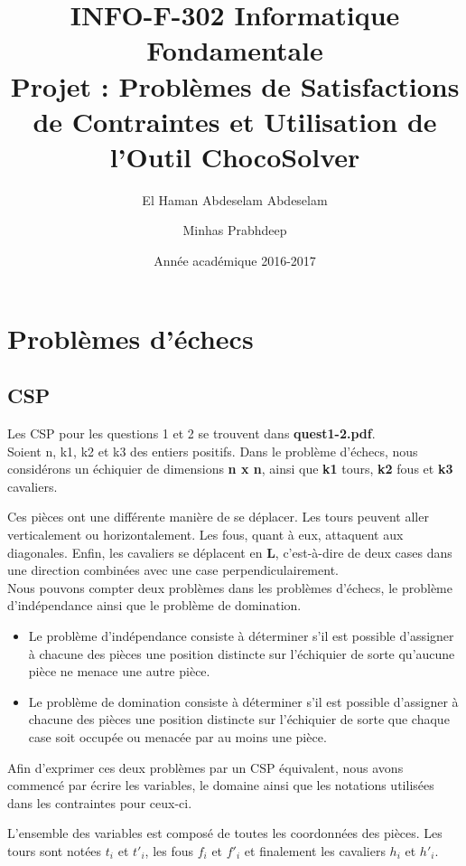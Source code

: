\documentclass{article}
\title{INFO-F-302 Informatique Fondamentale\\ Projet : Problèmes de Satisfactions de Contraintes et Utilisation de l’Outil ChocoSolver}
\author{El Haman Abdeselam Abdeselam \and Minhas Prabhdeep}
\date{Année académique 2016-2017}
\begin{document}
\maketitle

\section{Problèmes d'échecs}

\subsection{CSP}
Les CSP pour les questions 1 et 2 se trouvent dans \textbf{quest1-2.pdf}.\\

Soient n, k1, k2 et k3 des entiers positifs.
Dans le problème d'échecs, nous considérons un échiquier de dimensions \textbf{n x n}, ainsi que \textbf{k1} tours, \textbf{k2} fous et \textbf{k3} cavaliers. 

Ces pièces ont une différente manière de se déplacer. Les tours peuvent aller verticalement ou horizontalement. Les fous, quant à eux, attaquent aux diagonales. Enfin, les cavaliers se déplacent en \textbf{L}, c’est-à-dire de deux cases dans une direction combinées avec une case perpendiculairement. \\

Nous pouvons compter deux problèmes dans les problèmes d'échecs, le problème d'indépendance ainsi que le problème de domination.
\begin{itemize}
\item Le problème d'indépendance consiste à déterminer s'il est possible d'assigner à chacune des pièces une position distincte sur l'échiquier de sorte qu'aucune pièce ne menace une autre pièce.
\item Le problème de domination consiste à déterminer s'il est possible d'assigner à chacune des pièces une position distincte sur l'échiquier de sorte que chaque case soit occupée ou menacée par au moins une pièce. \\
\end{itemize}

Afin d'exprimer ces deux problèmes par un CSP équivalent, nous avons commencé par écrire les variables, le domaine ainsi que les notations utilisées dans les contraintes pour ceux-ci.

L'ensemble des variables est composé de toutes les coordonnées des pièces. Les tours sont notées $t_{i}$ et $t'_{i}$, les fous $f_{i}$ et $f'_{i}$ et finalement les cavaliers $h_{i}$ et $h'_{i}$.
\end{document}
